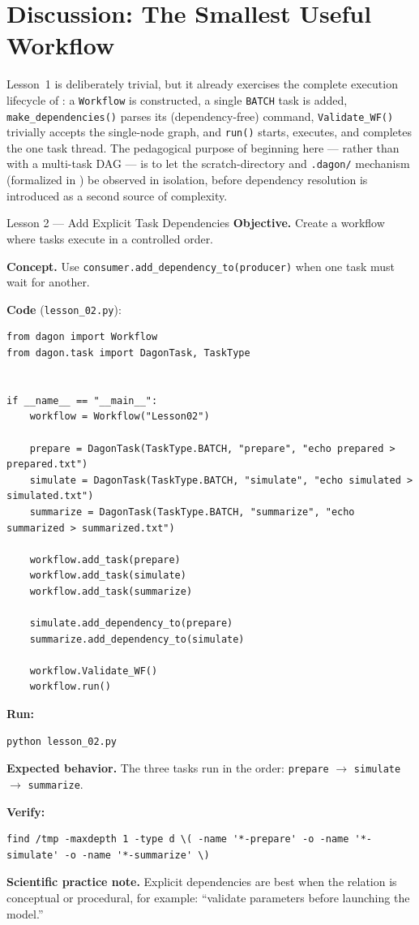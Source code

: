 \section{Discussion: The Smallest Useful Workflow}

Lesson~1 is deliberately trivial, but it already exercises the complete
execution lifecycle of : a \texttt{Workflow} is
constructed, a single \texttt{BATCH} task is added, \texttt{make\_dependencies()}
parses its (dependency-free) command, \texttt{Validate\_WF()} trivially
accepts the single-node graph, and \texttt{run()} starts, executes, and
completes the one task thread. The pedagogical purpose of beginning here ---
rather than with a multi-task DAG --- is to let the scratch-directory and
\texttt{.dagon/} mechanism (formalized in ) be observed
in isolation, before dependency resolution is introduced as a second source
of complexity.

\begin{lessonbox}{Lesson 2 --- Add Explicit Task Dependencies}
\textbf{Objective.} Create a workflow where tasks execute in a controlled
order.

\textbf{Concept.} Use \texttt{consumer.add\_dependency\_to(producer)} when one
task must wait for another.

\textbf{Code} (\texttt{lesson\_02.py}):
\begin{lstlisting}
from dagon import Workflow
from dagon.task import DagonTask, TaskType


if __name__ == "__main__":
    workflow = Workflow("Lesson02")

    prepare = DagonTask(TaskType.BATCH, "prepare", "echo prepared > prepared.txt")
    simulate = DagonTask(TaskType.BATCH, "simulate", "echo simulated > simulated.txt")
    summarize = DagonTask(TaskType.BATCH, "summarize", "echo summarized > summarized.txt")

    workflow.add_task(prepare)
    workflow.add_task(simulate)
    workflow.add_task(summarize)

    simulate.add_dependency_to(prepare)
    summarize.add_dependency_to(simulate)

    workflow.Validate_WF()
    workflow.run()
\end{lstlisting}

\textbf{Run:}
\begin{lstlisting}[style=bash]
python lesson_02.py
\end{lstlisting}

\textbf{Expected behavior.} The three tasks run in the order:
\texttt{prepare} $\to$ \texttt{simulate} $\to$ \texttt{summarize}.

\textbf{Verify:}
\begin{lstlisting}[style=bash]
find /tmp -maxdepth 1 -type d \( -name '*-prepare' -o -name '*-simulate' -o -name '*-summarize' \)
\end{lstlisting}

\textbf{Scientific practice note.} Explicit dependencies are best when the
relation is conceptual or procedural, for example: ``validate parameters
before launching the model.''
\end{lessonbox}

